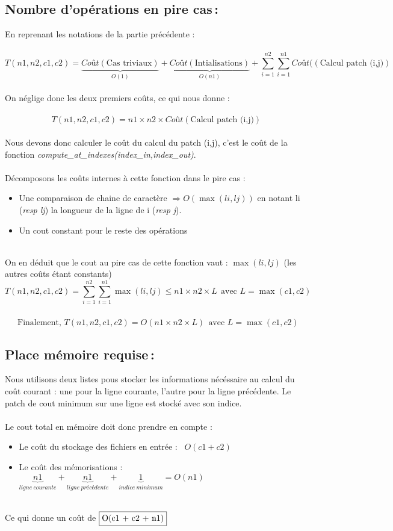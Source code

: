 \documentclass[a4paper, 10pt, french]{article}
\begin{document}
  \subsection{Nombre  d'opérations en pire cas\,:}
    En reprenant les notations de la partie précédente : \\ \\
    $$T(n1,n2,c1,c2) = \underbrace{Coût(\text{Cas triviaux})}_{O(1)} + 
    \underbrace{Coût(\text{Intialisations})}_{O(n1)} + 
    \sum_{i=1}^{n2} \sum_{i=1}^{n1} Coût((\text{Calcul patch (i,j)})$$ \\
	On néglige donc les deux premiers coûts, ce qui nous donne : \\ \\
	$$T(n1,n2,c1,c2) = n1 \times n2 \times Coût(\text{Calcul patch (i,j)})$$
	\\ 
	Nous devons donc calculer le coût du calcul du patch (i,j), c'est le coût de la fonction \emph{compute\_at\_indexes(index\_in,index\_out)}.\\ \\
	Décomposons les coûts internes à cette fonction dans le pire cas :
	\begin{itemize}
	\item Une comparaison de chaine de caractère $\Rightarrow  O(\max(li,lj))$ en notant li (\textit{resp lj}) la longueur de la ligne de i (\textit{resp j}).
	\item Un cout constant pour le reste des opérations
	\end{itemize}
	~\\
	On en déduit que le cout au pire cas de cette fonction vaut : $\max(li,lj)$ (les autres coûts étant constants)
	\\ 
	$$T(n1,n2,c1,c2) = \sum_{i=1}^{n2} \sum_{i=1}^{n1} \max(li,lj) \leq n1 \times n2 \times L \ \ \text{avec } L = \max(c1,c2)$$
	\\
	 \ \ \ $\text{Finalement, } T(n1,n2,c1,c2) = O(n1 \times n2 \times L)\ \ \text{avec } L = \max(c1,c2) $
  \subsection{Place mémoire requise\,: }
	Nous utilisons deux listes pous stocker les informations nécéssaire au calcul du coût 		  courant : une pour la ligne courante, l'autre pour la ligne
    précédente. Le patch de cout minimum sur une ligne est stocké avec son indice.\\ \\
    Le cout total en mémoire doit donc prendre en compte : 
    \begin{itemize}
    \item Le coût du stockage des fichiers en entrée : \ $O(c1 + c2)$
    \item Le coût des mémorisations :  $\underbrace{n1}_{ligne\ courante} + \underbrace{n1}_{ligne\ précédente} + \underbrace{1}_{indice \ minimum} = O(n1)$
    \end{itemize}
    ~\\
    Ce qui donne un coût de $\fbox{O(c1 + c2 + n1)}$
\end{document}

